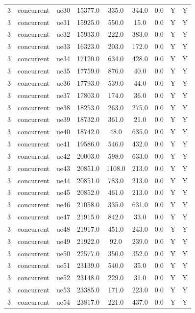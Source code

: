 \begin{table}[ht]
\begin{tabular}{|c|c|c|c|c|c|c|c|c|}
3 & concurrent & ue30 & 15377.0 & 335.0 & 344.0 & 0.0 & Y & Y \\
3 & concurrent & ue31 & 15925.0 & 550.0 & 15.0 & 0.0 & Y & Y \\
3 & concurrent & ue32 & 15933.0 & 222.0 & 383.0 & 0.0 & Y & Y \\
3 & concurrent & ue33 & 16323.0 & 203.0 & 172.0 & 0.0 & Y & Y \\
3 & concurrent & ue34 & 17120.0 & 634.0 & 428.0 & 0.0 & Y & Y \\
3 & concurrent & ue35 & 17759.0 & 876.0 & 40.0 & 0.0 & Y & Y \\
3 & concurrent & ue36 & 17793.0 & 539.0 & 44.0 & 0.0 & Y & Y \\
3 & concurrent & ue37 & 17803.0 & 174.0 & 36.0 & 0.0 & Y & Y \\
3 & concurrent & ue38 & 18253.0 & 263.0 & 275.0 & 0.0 & Y & Y \\
3 & concurrent & ue39 & 18732.0 & 361.0 & 21.0 & 0.0 & Y & Y \\
3 & concurrent & ue40 & 18742.0 & 48.0 & 635.0 & 0.0 & Y & Y \\
3 & concurrent & ue41 & 19586.0 & 546.0 & 432.0 & 0.0 & Y & Y \\
3 & concurrent & ue42 & 20003.0 & 598.0 & 633.0 & 0.0 & Y & Y \\
3 & concurrent & ue43 & 20851.0 & 1108.0 & 213.0 & 0.0 & Y & Y \\
3 & concurrent & ue44 & 20851.0 & 783.0 & 213.0 & 0.0 & Y & Y \\
3 & concurrent & ue45 & 20852.0 & 461.0 & 213.0 & 0.0 & Y & Y \\
3 & concurrent & ue46 & 21058.0 & 335.0 & 631.0 & 0.0 & Y & Y \\
3 & concurrent & ue47 & 21915.0 & 842.0 & 33.0 & 0.0 & Y & Y \\
3 & concurrent & ue48 & 21917.0 & 451.0 & 243.0 & 0.0 & Y & Y \\
3 & concurrent & ue49 & 21922.0 & 92.0 & 239.0 & 0.0 & Y & Y \\
3 & concurrent & ue50 & 22577.0 & 350.0 & 352.0 & 0.0 & Y & Y \\
3 & concurrent & ue51 & 23139.0 & 540.0 & 35.0 & 0.0 & Y & Y \\
3 & concurrent & ue52 & 23148.0 & 229.0 & 31.0 & 0.0 & Y & Y \\
3 & concurrent & ue53 & 23385.0 & 171.0 & 223.0 & 0.0 & Y & Y \\
3 & concurrent & ue54 & 23817.0 & 221.0 & 437.0 & 0.0 & Y & Y \\

\end{tabular}
\end{table}
